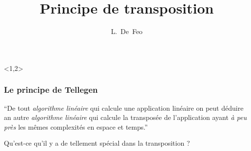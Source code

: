 \documentclass[10pt]{beamer}
\title[Principe de transposition]{Principe de transposition
  \only<1>{et tours d'Artin-Schreier}}
\author{L.~De~Feo}
\institute[]{LIX, École Polytechnique}
\begin{document}
\begin{frame}<1,2>
  \titlepage
\end{frame}


\begin{frame}
  \frametitle{Le principe de Tellegen}

  \Large
  \begin{center}
    ``De tout \emph{algorithme linéaire} qui calcule une application
    linéaire on peut déduire an autre \emph{algorithme linéaire} qui
    calcule la transposée de l'application ayant \emph{à peu près} les
    mêmes complexités en espace et temps.''
  \end{center}

  \vfill
  \pause

  \begin{center}
    Qu'est-ce qu'il y a de tellement spécial dans la transposition ?
  \end{center}
\end{frame}
\end{document}
